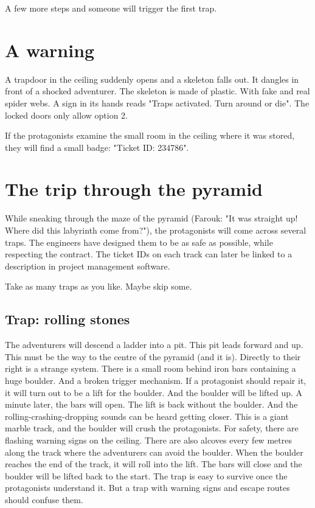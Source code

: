 A few more steps and someone will trigger the first trap.

\section{A warning}

A trapdoor in the ceiling suddenly opens and a skeleton falls out. It dangles in front of a shocked adventurer. The skeleton is made of plastic. With fake and real spider webs. A sign in its hands reads "Traps activated. Turn around or die". The locked doors only allow option 2.

If the protagonists examine the small room in the ceiling where it was stored, they will find a small badge: "Ticket ID: 234786".

\section{The trip through the pyramid}

While sneaking through the maze of the pyramid (Farouk: "It was straight up! Where did this labyrinth come from?"), the protagonists will come across several traps. The engineers have designed them to be as safe as possible, while respecting the contract. The ticket IDs on each track can later be linked to a description in project management software.

Take as many traps as you like. Maybe skip some.

\subsection{Trap: rolling stones}

The adventurers will descend a ladder into a pit. This pit leads forward and up. This must be the way to the centre of the pyramid (and it is). Directly to their right is a strange system. There is a small room behind iron bars containing a huge boulder. And a broken trigger mechanism. If a protagonist should repair it, it will turn out to be a lift for the boulder. And the boulder will be lifted up.
A minute later, the bars will open. The lift is back without the boulder. And the rolling-crashing-dropping sounds can be heard getting closer. This is a giant marble track, and the boulder will crush the protagonists. For safety, there are flashing warning signs on the ceiling. There are also alcoves every few metres along the track where the adventurers can avoid the boulder.
When the boulder reaches the end of the track, it will roll into the lift. The bars will close and the boulder will be lifted back to the start.
The trap is easy to survive once the protagonists understand it. But a trap with warning signs and escape routes should confuse them.

